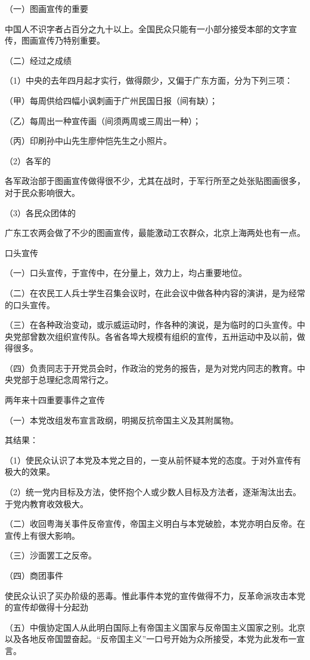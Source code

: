 （一）图画宣传的重要

中国人不识字者占百分之九十以上。全国民众只能有一小部分接受本部的文字宣传，图画宣传乃特别重要。

（二）经过之成绩

（1）中央的去年四月起才实行，做得颇少，又偏于广东方面，分为下列三项：

（甲）每周供给四幅小讽刺画于广州民国日报（间有缺）；

（乙）每周出一种宣传画（间须两周或三周出一种）；

（丙）印刷孙中山先生廖仲恺先生之小照片。

（2）各军的

各军政治部于图画宣传做得很不少，尤其在战时，于军行所至之处张贴图画很多，对于民众影响很大。

（3）各民众团体的

广东工农两会做了不少的图画宣传，最能激动工农群众，北京上海两处也有一点。

口头宣传

（一）口头宣传，于宣传中，在分量上，效力上，均占重要地位。

（二）在农民工人兵士学生召集会议时，在此会议中做各种内容的演讲，是为经常的口头宣传。

（三）在各种政治变动，或示威运动时，作各种的演说，是为临时的口头宣传。中央党部曾数次组织宣传队。各省各埠大规模有组织的宣传，五卅运动中及以前，做得很多。

（四）负责同志于开党员会时，作政治的党务的报告，是为对党内同志的教育。中央党部于总理纪念周常行之。

两年来十四重要事件之宣传

（一）本党改组发布宣言政纲，明揭反抗帝国主义及其附属物。

其结果：

（1）使民众认识了本党及本党之目的，一变从前怀疑本党的态度。于对外宣传有极大的效果。

（2）统一党内目标及方法，使怀抱个人或少数人目标及方法者，逐渐淘汰出去。于党内教育收效极大。

（二）收回粤海关事件反帝宣传，帝国主义明白与本党破脸，本党亦明白反帝。在宣传上有很大影响。

（三）沙面罢工之反帝。

（四）商团事件

使民众认识了买办阶级的恶毒。惟此事件本党的宣传做得不力，反革命派攻击本党的宣传却做得十分起劲

（五）中俄协定国人从此明白国际上有帝国主义国家与反帝国主义国家之别。北京以及各地反帝国盟奋起。“反帝国主义”一口号开始为众所接受，本党为此发布一宣言。

